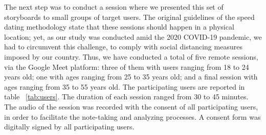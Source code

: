 The next step was to conduct a session where we presented this set of storyboards to small groups of target users. The original guidelines of the speed dating methodology state that these sessions should happen in a physical location; yet, as our study was conducted amid the 2020 COVID-19 pandemic, we had to circumvent this challenge, to comply with social distancing measures imposed by our country. Thus, we have conducted a total of five remote sessions, via the Google Meet platform: three of them with users ranging from 18 to 24 years old; one with ages ranging from 25 to 35 years old; and a final session with ages ranging from 35 to 55 years old. The participating users are reported in table ~\ref{tab:users}. The duration of each session ranged from 30 to 45 minutes. The audio of the session was recorded with the consent of all participating users, in order to facilitate the note-taking and analyzing processes. A consent form was digitally signed by all participating users.


